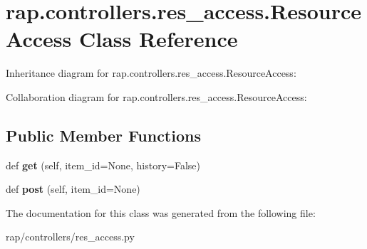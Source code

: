 \hypertarget{classrap_1_1controllers_1_1res__access_1_1ResourceAccess}{}\section{rap.\+controllers.\+res\+\_\+access.\+Resource\+Access Class Reference}
\label{classrap_1_1controllers_1_1res__access_1_1ResourceAccess}


Inheritance diagram for rap.\+controllers.\+res\+\_\+access.\+Resource\+Access\+:


Collaboration diagram for rap.\+controllers.\+res\+\_\+access.\+Resource\+Access\+:
\subsection*{Public Member Functions}
\begin{DoxyCompactItemize}
\item 
\mbox{\label{classrap_1_1controllers_1_1res__access_1_1ResourceAccess_a56e796d45b187db75d43ae857873c8c8}} 
def {\bfseries get} (self, item\+\_\+id=None, history=False)
\item 
\mbox{\label{classrap_1_1controllers_1_1res__access_1_1ResourceAccess_a0758a0634774f25743f6bc51c8c42c80}} 
def {\bfseries post} (self, item\+\_\+id=None)
\end{DoxyCompactItemize}


The documentation for this class was generated from the following file\+:\begin{DoxyCompactItemize}
\item 
rap/controllers/res\+\_\+access.\+py\end{DoxyCompactItemize}

